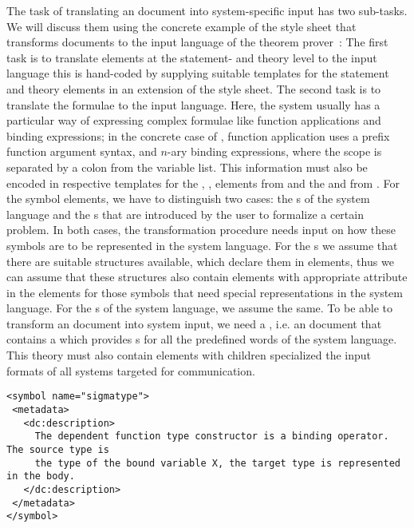 \begin{omgroup}[id=transform-xsl,short=Transforming OMDoc]
The task of translating an {\omdoc} document into system-specific input has two
sub-tasks. We will discuss them using the concrete example of the
{} style sheet that transforms {\omdoc} documents to the input
language of the {\pvs} theorem prover~\cite{OwRu92}: The first task is to translate
elements at the statement- and theory level to the input language this is hand-coded by
supplying suitable templates for the {\omdoc} statement and theory elements in an
extension of the {} style sheet. The second task is to translate
the formulae to the input language. Here, the system usually has a particular way of
expressing complex formulae like function applications and binding expressions; in the
concrete case of {\pvs}, function application uses a prefix function argument syntax, and
$n$-ary binding expressions, where the scope is separated by a colon from the variable
list. This information must also be encoded in respective templates for the
{}, {}, {}
elements from {\openmath} and the {} and {}
from {\cmathml}. For the symbol elements, we have to distinguish two cases: the
{s} of the system language and the {s}
that are introduced by the user to formalize a certain problem. In both cases, the
transformation procedure needs input on how these symbols are to be represented in the
system language. For the {s} we assume that there are suitable
{} structures available, which declare them in {}
elements, thus we can assume that these {} structures also contain
{} elements with appropriate {} attribute in the
{} elements for those symbols that need special representations in
the system language.  For the {s} of the system language, we
assume the same.  To be able to transform an {\omdoc} document into system input, we need
a {}, i.e. an {\omdoc} document that contains a
{} which provides {s} for all the predefined words of the
system language. This theory must also contain {} elements with
{} children specialized the input formats of all systems targeted for
communication.

\begin{lstlisting}[label=lst:system-language,
  caption={A {\element{symbol}} in a Language Definition Theory},
  index={symbol,presentation,style}]
<symbol name="sigmatype">
 <metadata>
   <dc:description>
     The dependent function type constructor is a binding operator. The source type is
     the type of the bound variable X, the target type is represented in the body.
   </dc:description>
 </metadata>
</symbol>


\end{lstlisting}
\end{omgroup}

